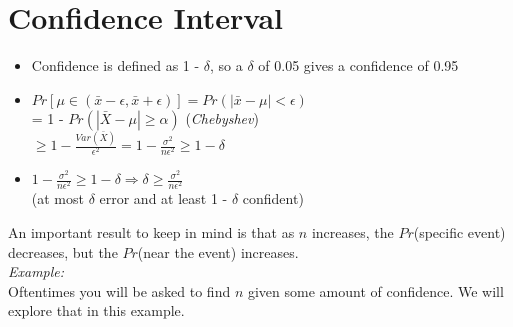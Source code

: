 \documentclass[a4paper]{article}
\begin{document}
\section{Confidence Interval}
\begin{itemize}
        \item Confidence is defined as 1 - $\delta$, so a $\delta $ of 0.05 gives a confidence of 0.95
        \item $Pr[\mu \in (\bar x - \epsilon, \bar x + \epsilon)] = Pr(|\bar x - \mu| < \epsilon)$ \\
        = 1 - $Pr(|\bar X-\mu| \geq \alpha)$ (\textit{Chebyshev})\\
        $\geq 1 - \frac{Var(\bar X)}{\epsilon^2} = 1 - \frac{\sigma^2}{n\epsilon^2} \geq 1 - \delta$
        \item $1 - \frac{\sigma^2}{n\epsilon^2} \geq 1 - \delta \Rightarrow \delta \geq \frac{\sigma^2}{n\epsilon^2}$\\ (at most $\delta$ error and at least 1 - $\delta$ confident)
\end{itemize}
An important result to keep in mind is that as $n$ increases, the $Pr$(specific event) decreases, but the $Pr$(near the event) increases.\\
\textit{Example:}\\
Oftentimes you will be asked to find $n$ given some amount of confidence. We will explore that in this example.
\end{document}
